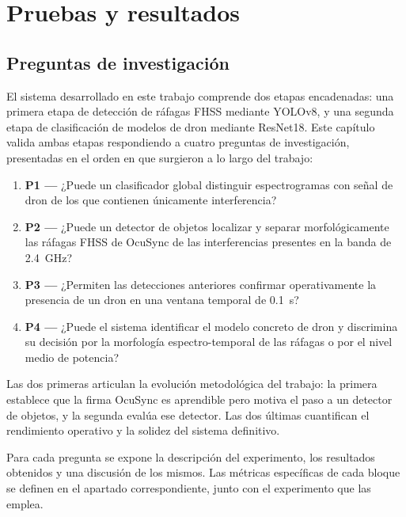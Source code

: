 \chapter{Pruebas y resultados}
\label{cap:pruebas_resultados}

\section{Preguntas de investigación}
\label{sec:preguntas_investigacion}

El sistema desarrollado en este trabajo comprende dos etapas encadenadas: una primera etapa de detección de ráfagas FHSS mediante YOLOv8, y una segunda etapa de clasificación de modelos de dron mediante ResNet18. Este capítulo valida ambas etapas respondiendo a cuatro preguntas de investigación, presentadas en el orden en que surgieron a lo largo del trabajo:

\begin{enumerate}
  \item \textbf{P1 ---} ¿Puede un clasificador global distinguir espectrogramas con señal de dron de los que contienen únicamente interferencia?
  \item \textbf{P2 ---} ¿Puede un detector de objetos localizar y separar morfológicamente las ráfagas FHSS de OcuSync de las interferencias presentes en la banda de \SI{2.4}{\giga\hertz}?
  \item \textbf{P3 ---} ¿Permiten las detecciones anteriores confirmar operativamente la presencia de un dron en una ventana temporal de \SI{0.1}{\second}?
  \item \textbf{P4 ---} ¿Puede el sistema identificar el modelo concreto de dron y discrimina su decisión por la morfología espectro-temporal de las ráfagas o por el nivel medio de potencia?
\end{enumerate}

Las dos primeras articulan la evolución metodológica del trabajo: la primera establece que la firma OcuSync es aprendible pero motiva el paso a un detector de objetos, y la segunda evalúa ese detector. Las dos últimas cuantifican el rendimiento operativo y la solidez del sistema definitivo.

Para cada pregunta se expone la descripción del experimento, los resultados obtenidos y una discusión de los mismos. Las métricas específicas de cada bloque se definen en el apartado correspondiente, junto con el experimento que las emplea.

